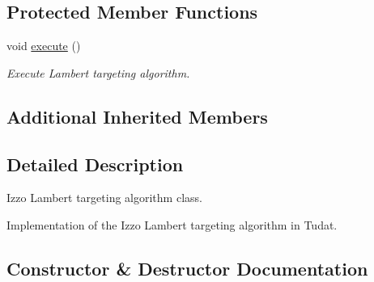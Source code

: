 \subsection*{Protected Member Functions}
\begin{DoxyCompactItemize}
\item 
void \hyperlink{classtudat_1_1mission__segments_1_1LambertTargeterIzzo_a912b334947302675369e10f964770028}{execute} ()
\begin{DoxyCompactList}\small\item\em Execute Lambert targeting algorithm. \end{DoxyCompactList}\end{DoxyCompactItemize}
\subsection*{Additional Inherited Members}


\subsection{Detailed Description}
Izzo Lambert targeting algorithm class. 

Implementation of the Izzo Lambert targeting algorithm in Tudat. 

\subsection{Constructor \& Destructor Documentation}

